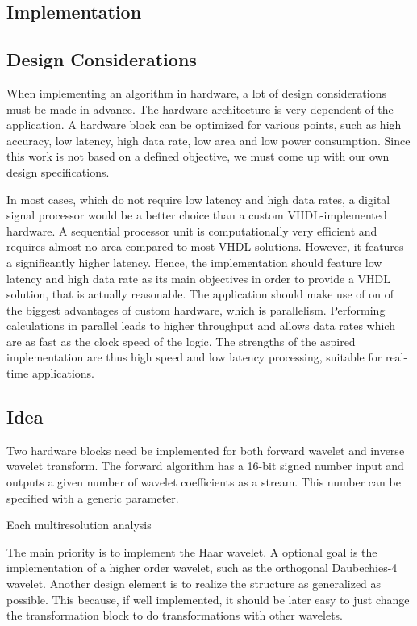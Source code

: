 \begin{refsection}
\section{Implementation}

\subsection{Design Considerations}

When implementing an algorithm in hardware, a lot of design considerations must be made in advance.
The hardware architecture is very dependent of the application.
A hardware block can be optimized for various points, such as high accuracy, low latency, high data rate, low area and low power consumption.
Since this work is not based on a defined objective, we must come up with our own design specifications.

In most cases, which do not require low latency and high data rates, a digital signal processor would be a better choice than a custom VHDL-implemented hardware.
A sequential processor unit is computationally very efficient and requires almost no area compared to most VHDL solutions.
However, it features a significantly higher latency.
Hence, the implementation should feature low latency and high data rate as its main objectives in order to provide a VHDL solution, that is actually reasonable.
The application should make use of on of the biggest advantages of custom hardware, which is parallelism.
Performing calculations in parallel leads to higher throughput and allows data rates which are as fast as the clock speed of the logic.
The strengths of the aspired implementation are thus high speed and low latency processing, suitable for real-time applications.


\subsection{Idea}

Two hardware blocks need be implemented for both forward wavelet and inverse wavelet transform.
The forward algorithm has a 16-bit signed number input and outputs a given number of wavelet coefficients as a stream.
This number can be specified with a generic parameter.

Each multiresolution analysis 

The main priority is to implement the Haar wavelet.
A optional goal is the implementation of a higher order wavelet, such as the orthogonal Daubechies-4 wavelet.
Another design element is to realize the structure as generalized as possible.
This because, if well implemented, it should be later easy to just change the transformation block to do transformations with other wavelets.



\end{refsection}
